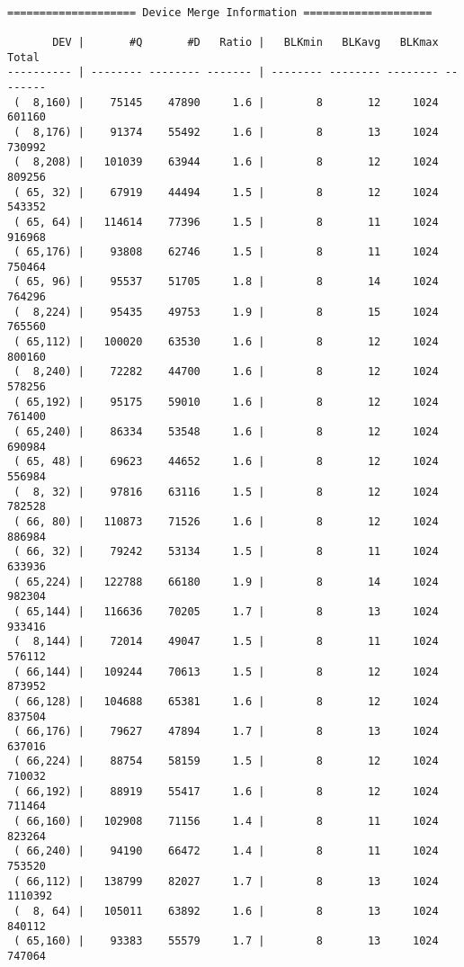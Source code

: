 \documentclass{article}
\begin{document}
\newpage\begin{verbatim}

==================== Device Merge Information ====================

       DEV |       #Q       #D   Ratio |   BLKmin   BLKavg   BLKmax    Total
---------- | -------- -------- ------- | -------- -------- -------- --------
 (  8,160) |    75145    47890     1.6 |        8       12     1024   601160
 (  8,176) |    91374    55492     1.6 |        8       13     1024   730992
 (  8,208) |   101039    63944     1.6 |        8       12     1024   809256
 ( 65, 32) |    67919    44494     1.5 |        8       12     1024   543352
 ( 65, 64) |   114614    77396     1.5 |        8       11     1024   916968
 ( 65,176) |    93808    62746     1.5 |        8       11     1024   750464
 ( 65, 96) |    95537    51705     1.8 |        8       14     1024   764296
 (  8,224) |    95435    49753     1.9 |        8       15     1024   765560
 ( 65,112) |   100020    63530     1.6 |        8       12     1024   800160
 (  8,240) |    72282    44700     1.6 |        8       12     1024   578256
 ( 65,192) |    95175    59010     1.6 |        8       12     1024   761400
 ( 65,240) |    86334    53548     1.6 |        8       12     1024   690984
 ( 65, 48) |    69623    44652     1.6 |        8       12     1024   556984
 (  8, 32) |    97816    63116     1.5 |        8       12     1024   782528
 ( 66, 80) |   110873    71526     1.6 |        8       12     1024   886984
 ( 66, 32) |    79242    53134     1.5 |        8       11     1024   633936
 ( 65,224) |   122788    66180     1.9 |        8       14     1024   982304
 ( 65,144) |   116636    70205     1.7 |        8       13     1024   933416
 (  8,144) |    72014    49047     1.5 |        8       11     1024   576112
 ( 66,144) |   109244    70613     1.5 |        8       12     1024   873952
 ( 66,128) |   104688    65381     1.6 |        8       12     1024   837504
 ( 66,176) |    79627    47894     1.7 |        8       13     1024   637016
 ( 66,224) |    88754    58159     1.5 |        8       12     1024   710032
 ( 66,192) |    88919    55417     1.6 |        8       12     1024   711464
 ( 66,160) |   102908    71156     1.4 |        8       11     1024   823264
 ( 66,240) |    94190    66472     1.4 |        8       11     1024   753520
 ( 66,112) |   138799    82027     1.7 |        8       13     1024  1110392
 (  8, 64) |   105011    63892     1.6 |        8       13     1024   840112
 ( 65,160) |    93383    55579     1.7 |        8       13     1024   747064

\end{verbatim}
\end{document}
